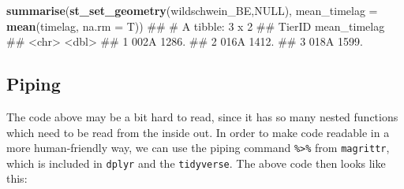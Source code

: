 \documentclass[]{book}
\newenvironment{Shaded}{\begin{snugshade}}{\end{snugshade}}
\newcommand{\KeywordTok}[1]{\textcolor[rgb]{0.13,0.29,0.53}{\textbf{#1}}}
\newcommand{\DataTypeTok}[1]{\textcolor[rgb]{0.13,0.29,0.53}{#1}}
\newcommand{\StringTok}[1]{\textcolor[rgb]{0.31,0.60,0.02}{#1}}
\newcommand{\CommentTok}[1]{\textcolor[rgb]{0.56,0.35,0.01}{\textit{#1}}}
\newcommand{\OtherTok}[1]{\textcolor[rgb]{0.56,0.35,0.01}{#1}}
\newcommand{\OperatorTok}[1]{\textcolor[rgb]{0.81,0.36,0.00}{\textbf{#1}}}
\newcommand{\NormalTok}[1]{#1}
\begin{document}
\begin{Shaded}
\begin{Highlighting}[]

\KeywordTok{summarise}\NormalTok{(}\KeywordTok{st_set_geometry}\NormalTok{(wildschwein_BE,}\OtherTok{NULL}\NormalTok{), }\DataTypeTok{mean_timelag =} \KeywordTok{mean}\NormalTok{(timelag, }\DataTypeTok{na.rm =}\NormalTok{ T))}
\NormalTok{## # A tibble: 3 x 2}
\NormalTok{##   TierID mean_timelag}
\NormalTok{##   <chr>         <dbl>}
\NormalTok{## 1 002A          1286.}
\NormalTok{## 2 016A          1412.}
\NormalTok{## 3 018A          1599.}
\end{Highlighting}
\end{Shaded}

\subsection{Piping}\label{piping}

The code above may be a bit hard to read, since it has so many nested
functions which need to be read from the inside out. In order to make
code readable in a more human-friendly way, we can use the piping
command \texttt{\%\textgreater{}\%} from \texttt{magrittr}, which is
included in \texttt{dplyr} and the \texttt{tidyverse}. The above code
then looks like this:

\begin{Shaded}
\end{Shaded}
\end{document}

